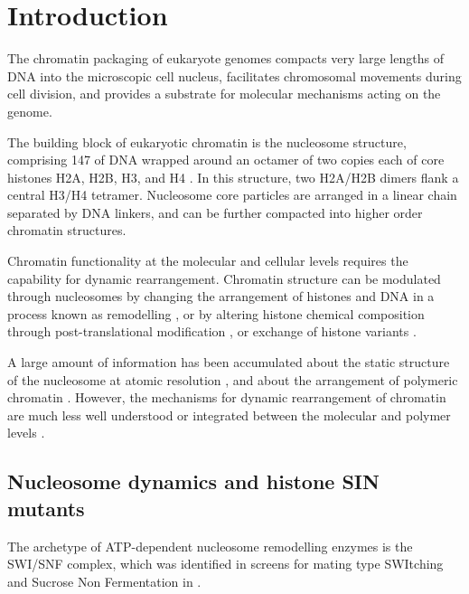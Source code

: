 \section{Introduction}

    The chromatin packaging of eukaryote genomes
    compacts very large lengths of DNA into the
    microscopic cell nucleus, facilitates chromosomal movements
    during cell division, and provides a substrate for molecular
    mechanisms acting on the genome.

    The building block of eukaryotic chromatin is the
    nucleosome structure, comprising \SI{147}{\bp} of DNA wrapped around an
    octamer of two copies each of core histones
    H2A, H2B, H3, and H4 \citep{Luger1997structure}.
    In this structure, two H2A/H2B dimers flank a central H3/H4 tetramer.
    Nucleosome core particles are arranged
    in a linear chain separated by DNA linkers, and can be further
    compacted into higher order chromatin structures.

    Chromatin functionality at the molecular and cellular levels
    requires the capability for dynamic rearrangement.  Chromatin
    structure can be modulated through nucleosomes by changing the
    arrangement of histones and DNA in a process known as remodelling
    \citep{flaus2011mechanisms}, or by altering histone chemical
    composition through post-translational modification
    \citep{bannister2011ptm-review}, or exchange of histone variants
    \citep{TalbertHenikoff2010}.

    A large amount of information has been accumulated about the static
    structure of the nucleosome at atomic resolution
    \citep{mcginty2014histone}, and about the arrangement of polymeric
    chromatin \citep{kuznetsova2016chromatin}.  However, the
    mechanisms for dynamic rearrangement of chromatin are much less
    well understood or integrated between the molecular and polymer
    levels \citep{andrews2011nucleosome}.

  \subsection{Nucleosome dynamics and histone SIN mutants}

    The archetype of ATP-dependent nucleosome remodelling enzymes is
    the SWI/SNF complex, which was identified in screens for mating
    type SWItching \citep{SWI-mutants} and Sucrose Non Fermentation
    \citep{SNF-mutants-original-discovery, SNF-mutants2} in
    .

